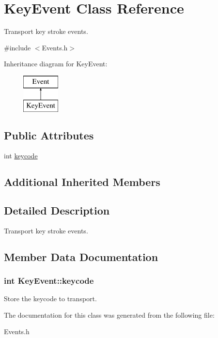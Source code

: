 \hypertarget{classKeyEvent}{\section{Key\-Event Class Reference}
\label{classKeyEvent}
}


Transport key stroke events.  




{\ttfamily \#include $<$Events.\-h$>$}

Inheritance diagram for Key\-Event\-:\begin{figure}[H]
\begin{center}
\leavevmode
\includegraphics[height=2.000000cm]{classKeyEvent}
\end{center}
\end{figure}
\subsection*{Public Attributes}
\begin{DoxyCompactItemize}
\item 
int \hyperlink{classKeyEvent_a099e4f3c01870f67baffeba80b5c1860}{keycode}
\end{DoxyCompactItemize}
\subsection*{Additional Inherited Members}


\subsection{Detailed Description}
Transport key stroke events. 

\subsection{Member Data Documentation}
\hypertarget{classKeyEvent_a099e4f3c01870f67baffeba80b5c1860}{
\subsubsection[{keycode}]{\setlength{\rightskip}{0pt plus 5cm}int Key\-Event\-::keycode}}\label{classKeyEvent_a099e4f3c01870f67baffeba80b5c1860}
Store the keycode to transport. 

The documentation for this class was generated from the following file\-:\begin{DoxyCompactItemize}
\item 
Events.\-h\end{DoxyCompactItemize}
